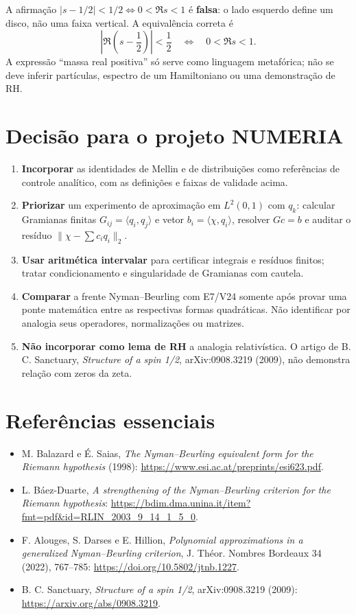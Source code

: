 \documentclass[11pt,a4paper]{article}
\begin{document}
A afirmação $|s-1/2|<1/2\iff0<\Re s<1$ é \textbf{falsa}: o lado esquerdo define um disco, não uma faixa vertical. A equivalência correta é
\[
\boxed{\left|\Re\left(s-\frac12\right)\right|<\frac12
\quad\Longleftrightarrow\quad 0<\Re s<1.}
\]
A expressão ``massa real positiva'' só serve como linguagem metafórica; não se deve inferir partículas, espectro de um Hamiltoniano ou uma demonstração de RH.

\section{Decisão para o projeto NUMERIA}
\begin{enumerate}[label=\arabic*.]
\item \textbf{Incorporar} as identidades de Mellin e de distribuições como referências de controle analítico, com as definições e faixas de validade acima.
\item \textbf{Priorizar} um experimento de aproximação em $L^2(0,1)$ com $q_k$: calcular Gramianas finitas $G_{ij}=\langle q_i,q_j\rangle$ e vetor $b_i=\langle\chi,q_i\rangle$, resolver $Gc=b$ e auditar o resíduo $\|\chi-\sum c_iq_i\|_2$.
\item \textbf{Usar aritmética intervalar} para certificar integrais e resíduos finitos; tratar condicionamento e singularidade de Gramianas com cautela.
\item \textbf{Comparar} a frente Nyman--Beurling com E7/V24 somente após provar uma ponte matemática entre as respectivas formas quadráticas. Não identificar por analogia seus operadores, normalizações ou matrizes.
\item \textbf{Não incorporar como lema de RH} a analogia relativística. O artigo de B. C. Sanctuary, \emph{Structure of a spin 1/2}, arXiv:0908.3219 (2009), não demonstra relação com zeros da zeta.
\end{enumerate}

\section*{Referências essenciais}
\begin{itemize}
\item M. Balazard e É. Saias, \emph{The Nyman--Beurling equivalent form for the Riemann hypothesis} (1998): \url{https://www.esi.ac.at/preprints/esi623.pdf}.
\item L. Báez-Duarte, \emph{A strengthening of the Nyman--Beurling criterion for the Riemann hypothesis}: \url{https://bdim.dma.unina.it/item?fmt=pdf&id=RLIN_2003_9_14_1_5_0}.
\item F. Alouges, S. Darses e E. Hillion, \emph{Polynomial approximations in a generalized Nyman--Beurling criterion}, J. Théor. Nombres Bordeaux 34 (2022), 767--785: \url{https://doi.org/10.5802/jtnb.1227}.
\item B. C. Sanctuary, \emph{Structure of a spin 1/2}, arXiv:0908.3219 (2009): \url{https://arxiv.org/abs/0908.3219}.
\end{itemize}
\end{document}
